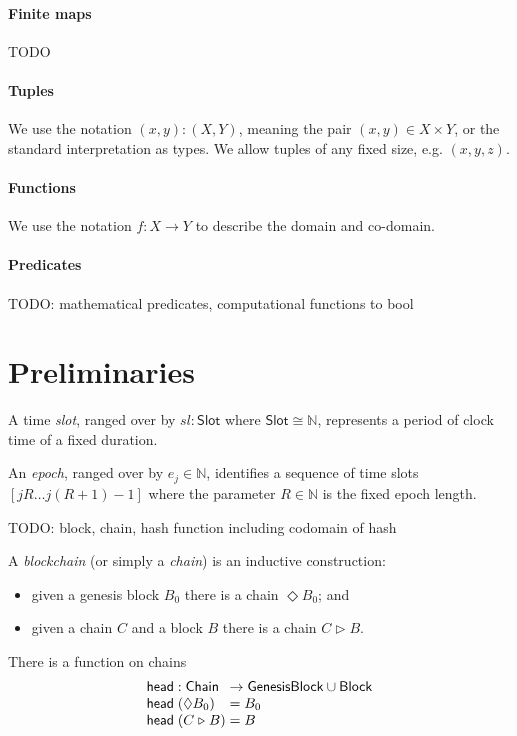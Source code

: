 \documentclass[12pt]{article}
\newcommand{\sExtend}{\mathrel{\triangleright}}
\newcommand{\sSlot}{sl}
\begin{document}
\paragraph{Finite maps}
TODO

\paragraph{Tuples}
We use the notation $(x,y) : (X,Y)$, meaning the pair $(x,y) \in X \times Y$,
or the standard interpretation as types. We allow tuples of any fixed size,
e.g. $(x, y, z)$.

\paragraph{Functions}
We use the notation $f : X \rightarrow Y$ to describe the domain and co-domain.

\paragraph{Predicates}
TODO: mathematical predicates, computational functions to bool


\section{Preliminaries}

A time \emph{slot}, ranged over by $\sSlot : \mathsf{Slot}$ where
$\mathsf{Slot} \cong \mathbb{N}$, represents a
period of clock time of a fixed duration.

An \emph{epoch}, ranged over by $e_j \in \mathbb{N}$, identifies a sequence of
time slots $[jR \ldots j(R+1) - 1]$ where the parameter $R \in \mathbb{N}$
is the fixed epoch length.

TODO: block, chain, hash function including codomain of hash

A \emph{blockchain} (or simply a \emph{chain}) is an inductive construction:
\begin{itemize}
\item given a genesis block $B_0$ there is a chain $\Diamond B_0$; and 
\item given a chain $C$ and a block $B$ there is a chain $C \sExtend B$.
\end{itemize}

There is a function on chains
\begin{equation*}
\begin{array}{l@{\;}l@{\;}l}
  \mathsf{head} & : \mathsf{Chain} & \rightarrow \mathsf{GenesisBlock} \cup \mathsf{Block}
  \\
  \mathsf{head} &(\Diamond B_0) & = B_0
  \\
  \mathsf{head} &(C \sExtend B) & = B
\end{array}
\end{equation*}
\end{document}
